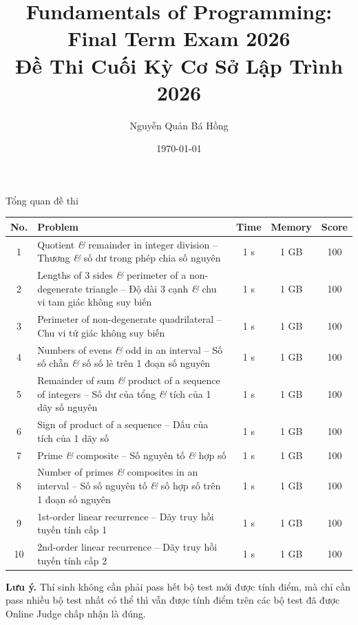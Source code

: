 \documentclass{article}
\title{Fundamentals of Programming: Final Term Exam 2026\\Đề Thi Cuối Kỳ Cơ Sở Lập Trình 2026}
\author{Nguyễn Quản Bá Hồng}
\date{\today}
\begin{document}
\maketitle

\begin{center}
    \Large
    Tổng quan đề thi
\end{center}

\begin{table}[H]
    \small
    \centering
    \begin{tabular}{|c|p{12cm}|c|c|c|}
        \hline
        {\bf No.} & {\bf Problem} & {\bf Time} & {\bf Memory} & {\bf Score} \\
        \hline
        1 & Quotient {\it\&} remainder in integer division -- Thương {\it\&} số dư trong phép chia số nguyên & 1 s & 1 GB & 100 \\
        \hline
        2 & Lengths of 3 sides {\it\&} perimeter of a non-degenerate triangle -- Độ dài 3 cạnh {\it\&} chu vi tam giác không suy biến & 1 s & 1 GB & 100 \\
        \hline
        3 & Perimeter of non-degenerate quadrilateral -- Chu vi tứ giác không suy biến & 1 s & 1 GB & 100 \\
        \hline
        4 & Numbers of evens {\it\&} odd in an interval -- Số số chẵn {\it\&} số số lẻ trên 1 đoạn số nguyên & 1 s & 1 GB & 100 \\
        \hline
        5 & Remainder of sum {\it\&} product of a sequence of integers -- Số dư của tổng {\it\&} tích của 1 dãy số nguyên & 1 s & 1 GB & 100 \\
        \hline
        6 & Sign of product of a sequence -- Dấu của tích của 1 dãy số & 1 s & 1 GB & 100 \\
        \hline
        7 & Prime {\it\&} composite -- Số nguyên tố {\it\&} hợp số & 1 s & 1 GB & 100 \\
        \hline
        8 & Number of primes {\it\&} composites in an interval -- Số số nguyên tố {\it\&} số hợp số trên 1 đoạn số nguyên & 1 s & 1 GB & 100 \\
        \hline
        9 & 1st-order linear recurrence -- Dãy truy hồi tuyến tính cấp 1 & 1 s & 1 GB & 100 \\
        \hline
        10 & 2nd-order linear recurrence -- Dãy truy hồi tuyến tính cấp 2 & 1 s & 1 GB & 100 \\
        \hline
    \end{tabular}
\end{table}
{\bf Lưu ý.} Thí sinh không cần phải pass hết bộ test mới được tính điểm, mà chỉ cần pass nhiều bộ test nhất có thể thì vẫn được tính điểm trên các bộ test đã được Online Judge chấp nhận là đúng.
\end{document}
